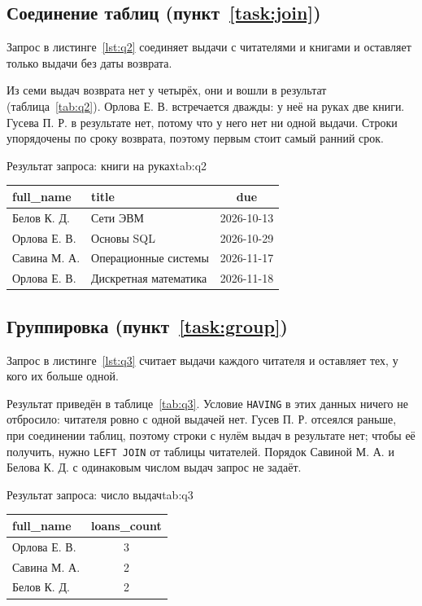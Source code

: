 \subsection{Соединение таблиц (пункт~\ref{task:join})}
Запрос в листинге~\ref{lst:q2} соединяет выдачи с читателями и книгами и оставляет только
выдачи без даты возврата.


Из семи выдач возврата нет у четырёх, они и вошли в результат
(таблица~\ref{tab:q2}). Орлова Е. В. встречается дважды: у неё на руках две книги. Гусева П.
Р. в результате нет, потому что у него нет ни одной выдачи. Строки упорядочены по сроку
возврата, поэтому первым стоит самый ранний срок.

\begin{bbttable}{Результат запроса: книги на руках}{tab:q2}
  \begin{tabular}{|l|l|c|}
    \hline
    full\_name & title & due \\ \hline
    Белов К. Д. & Сети ЭВМ & 2026-10-13 \\ \hline
    Орлова Е. В. & Основы SQL & 2026-10-29 \\ \hline
    Савина М. А. & Операционные системы & 2026-11-17 \\ \hline
    Орлова Е. В. & Дискретная математика & 2026-11-18 \\ \hline
  \end{tabular}
\end{bbttable}

\subsection{Группировка (пункт~\ref{task:group})}
Запрос в листинге~\ref{lst:q3} считает выдачи каждого читателя и оставляет тех, у кого их
больше одной.


Результат приведён в таблице~\ref{tab:q3}. Условие \texttt{HAVING} в этих данных ничего не
отбросило: читателя ровно с одной выдачей нет. Гусев П. Р. отсеялся раньше, при соединении
таблиц, поэтому строки с нулём выдач в результате нет; чтобы её получить, нужно
\texttt{LEFT JOIN} от таблицы читателей. Порядок Савиной М. А. и Белова К. Д. с одинаковым
числом выдач запрос не задаёт.

\begin{bbttable}{Результат запроса: число выдач}{tab:q3}
  \begin{tabular}{|l|c|}
    \hline
    full\_name & loans\_count \\ \hline
    Орлова Е. В. & 3 \\ \hline
    Савина М. А. & 2 \\ \hline
    Белов К. Д. & 2 \\ \hline
  \end{tabular}
\end{bbttable}

